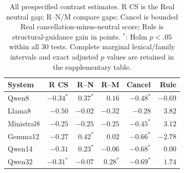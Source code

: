 \begin{table}[t]
\centering
\caption{All prespecified contrast estimates. R CS is the Real neutral gap; R--N/M compare gaps; Cancel is bounded Real cancellation-minus-neutral score; Rule is structural-guidance gain in points. $^{*}$: Holm $p<.05$ within all 30 tests. Complete marginal lexical/family intervals and exact adjusted $p$ values are retained in the supplementary table.}
\label{tab:primary_results}
\setlength{\tabcolsep}{2.3pt}
\begin{tabular}{lrrrrr}
\toprule
System & R CS & R--N & R--M & Cancel & Rule\\
\midrule
Qwen8 & $-0.34^{*}$ & $0.37^{*}$ & $0.16$ & $-0.48^{*}$ & $-0.69$ \\
Llama8 & $-0.50$ & $-0.02$ & $-0.32$ & $-0.28$ & $3.82$ \\
Ministral8 & $-0.25$ & $-0.25$ & $-0.25$ & $-0.45^{*}$ & $3.12$ \\
Gemma12 & $-0.27$ & $0.42^{*}$ & $0.02$ & $-0.66^{*}$ & $-2.78$ \\
Qwen14 & $-0.31$ & $0.23^{*}$ & $-0.06$ & $-0.68^{*}$ & $0.00$ \\
Qwen32 & $-0.31^{*}$ & $-0.07$ & $0.28^{*}$ & $-0.69^{*}$ & $1.74$ \\
\bottomrule
\end{tabular}
\end{table}
